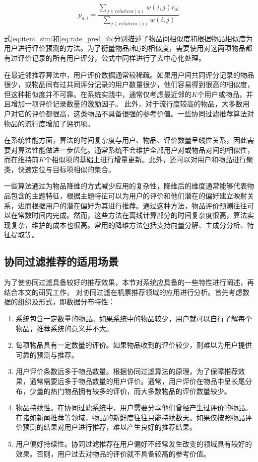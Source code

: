 \begin{equation}
\label{eq:rate_pred_ib}
	p_{a,i} = \frac{\sum_{j \in relaitem(a)}w(i,j)r_{ai}}{\sum_{j \in relaitem(a)}w(i,j)}
\end{equation}

式\ref{eq:item_sim}和\ref{eq:rate_pred_ib}分别描述了物品间相似度和根据物品相似度为用户进行评价预测的方法。为了衡量物品$i$和$j$的相似度，需要使用对这两项物品都有过评价记录的所有用户评分，公式中同样进行了去中心化处理。

在最近邻推荐算法中，用户评价数据通常较稀疏。如果用户间共同评分记录的物品很少，或物品间有过共同评分记录的用户数量很少，他们容易得到很高的相似度，但这种相似度并不可靠。在系统实践中，通常仅考虑最近邻的$K$个用户或物品，并且增加一项评价记录数量的激励因子。
此外，对于流行度较高的物品，大多数用户对它的评价都很高，这类物品不具备很强的参考价值。一些协同过滤推荐算法\cite{breese1998empirical}对物品的流行度增加了惩罚项。

在系统性能方面，算法的时间复杂度与用户、物品、评价数量呈线性关系，因此需要对算法性能做进一步优化。通常系统不会维护全部用户对或物品对间的相似性，而在维持前$K$个相似项的基础上进行增量更新\cite{herlocker1999algorithmic}。此外，还可以对用户和物品进行聚类，快速定位与目标项相似的集合。

一些算法通过为物品降维的方式减少应用的复杂性，降维后的维度通常能够代表物品包含的主题特征，根据主题特征可以为用户的评价和他们潜在的偏好建立映射关系，进而根据用户的潜在偏好为其进行推荐。通过这种方法，物品评价预测往往可以在常数时间内完成。然而，这些方法在离线计算部分的时间复杂度很高，算法实现复杂，维护的成本也很高。常用的降维方法包括支持向量分解、主成分分析、特征提取等。

\subsection{协同过滤推荐的适用场景}

为了使协同过滤具备较好的推荐效果，本节对系统应具备的一些特性进行阐述，再结合本文的研究工作， 对协同过滤在机票推荐领域的应用进行分析。首先考虑数据的组织及形式，即数据分布特性：

\begin{enumerate}
  \item 系统包含一定数量的物品。如果系统中的物品较少，用户就可以自行了解每个物品，推荐系统的意义并不大。
  \item 每项物品具有一定数量的评价。如果物品收到的评价较少，则难以为用户提供可靠的预测与推荐。
  \item 用户评价条数远多于物品数量。根据协同过滤算法的原理，为了保障推荐效果，通常需要远多于物品数量的用户评价。通常，用户评价在物品中呈长尾分布，少量的热门物品拥有较多的评价，而大多数物品的评价数量较少。
  \item 物品持续性。在协同过滤系统中，用户需要分享他们曾经产生过评价的物品。在诸如新闻推荐等领域，物品的新鲜度往往只能持续数天。如果仅按照物品评价预测的结果对用户进行推荐，难以产生良好的推荐结果。
  \item 用户偏好持续性。协同过滤推荐在用户偏好不经常发生改变的领域具有较好的效果。否则，用户过去对物品的评价就不具备较高的参考价值。
\end{enumerate}

